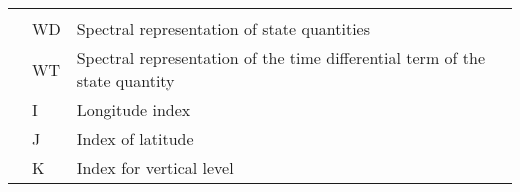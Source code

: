 \begin{longtable}[]{@{}lll@{}}
\begin{minipage}[t]{0.30\columnwidth}
\end{minipage}\tabularnewline
\begin{minipage}[t]{0.30\columnwidth}\raggedright
\strut
\end{minipage} & \begin{minipage}[t]{0.30\columnwidth}\raggedright
WD\strut
\end{minipage} & \begin{minipage}[t]{0.30\columnwidth}\raggedright
Spectral representation of state quantities\strut
\end{minipage}\tabularnewline
\begin{minipage}[t]{0.30\columnwidth}\raggedright
\strut
\end{minipage} & \begin{minipage}[t]{0.30\columnwidth}\raggedright
WT\strut
\end{minipage} & \begin{minipage}[t]{0.30\columnwidth}\raggedright
Spectral representation of the time differential term of the state
quantity\strut
\end{minipage}\tabularnewline
\begin{minipage}[t]{0.30\columnwidth}\raggedright
\strut
\end{minipage} & \begin{minipage}[t]{0.30\columnwidth}\raggedright
I\strut
\end{minipage} & \begin{minipage}[t]{0.30\columnwidth}\raggedright
Longitude index\strut
\end{minipage}\tabularnewline
\begin{minipage}[t]{0.30\columnwidth}\raggedright
\strut
\end{minipage} & \begin{minipage}[t]{0.30\columnwidth}\raggedright
J\strut
\end{minipage} & \begin{minipage}[t]{0.30\columnwidth}\raggedright
Index of latitude\strut
\end{minipage}\tabularnewline
\begin{minipage}[t]{0.30\columnwidth}\raggedright
\strut
\end{minipage} & \begin{minipage}[t]{0.30\columnwidth}\raggedright
K\strut
\end{minipage} & \begin{minipage}[t]{0.30\columnwidth}\raggedright
Index for vertical level\strut
\end{minipage}\tabularnewline

\end{longtable}
